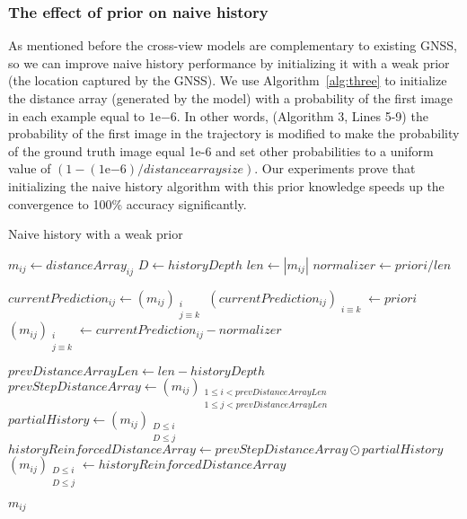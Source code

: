 \documentclass[10pt,letterpaper]{article}
\begin{document}
\subsubsection*{The effect of prior on naive history}
As mentioned before the cross-view models are complementary to existing GNSS, so we can improve naive history performance by initializing it with a weak prior (the location captured by the GNSS).  We use Algorithm~\ref{alg:three} to initialize the distance array (generated by the model) with a probability of the first image in each example equal to $1\mathrm{e}{-6}$. In other words, (Algorithm 3, Lines 5-9) the probability of the first image in the trajectory is modified to make the probability of the ground truth image equal 1e-6 and set other probabilities to a uniform value of $(1 - (1\mathrm{e}{-6}) / distance array size)$. Our experiments prove that initializing the naive history algorithm with this prior knowledge speeds up the convergence to 100\% accuracy significantly.

\begin{algorithm}[H]
  \caption{Naive history with a weak prior}\label{alg:three}
  $m_{ij} \gets distanceArray_{ij}$\;
  $D \gets historyDepth$\;
  $len \gets |m_{ij}|$\;
  $normalizer \gets priori/ len$\;
  
   {
      $currentPrediction_{ij} \gets (m_{ij})_{\substack{i\\ j \equiv k }}$\;
      $ (currentPrediction_{ij})_{\substack{i \equiv k}} \gets priori$\;
      $(m_{ij})_{\substack{i\\ j \equiv k }} \gets currentPrediction_{ij} - normalizer$\;
  }
  
   {
      $prevDistanceArrayLen \gets len - historyDepth$\;
      $prevStepDistanceArray \gets (m_{ij})_{\substack{1\le i < prevDistanceArrayLen \\ 1\le j < prevDistanceArrayLen }}$\;
      $partialHistory \gets (m_{ij})_{\substack{D \le i \\ D \le j}}$\;
      $historyReinforcedDistanceArray \gets prevStepDistanceArray \odot partialHistory$\;
      $(m_{ij})_{\substack{D \le i \\ D \le j}} \gets historyReinforcedDistanceArray$\;
  }
  
  \Return $m_{ij}$\;
\end{algorithm}
\FloatBarrier
\end{document}
